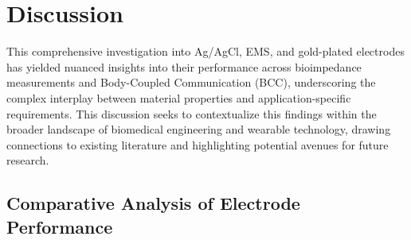\documentclass[conference]{IEEEtran}
\begin{document}

\section{Discussion}

This comprehensive investigation into Ag/AgCl, EMS, and gold-plated electrodes has yielded nuanced insights into their performance across bioimpedance measurements and Body-Coupled Communication (BCC), underscoring the complex interplay between material properties and application-specific requirements. This discussion seeks to contextualize this findings within the broader landscape of biomedical engineering and wearable technology, drawing connections to existing literature and highlighting potential avenues for future research.

\subsection{Comparative Analysis of Electrode Performance}
\end{document}

